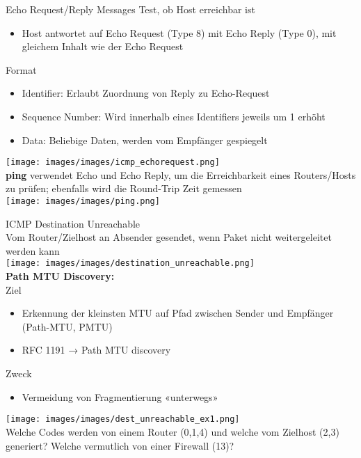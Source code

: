\begin{definition}{Echo Request/Reply Messages}
    Test, ob Host erreichbar ist
    \begin{itemize}
        \item Host antwortet auf Echo Request (Type 8) mit Echo Reply (Type 0), mit gleichem Inhalt wie der Echo Request
    \end{itemize}
    Format
    \begin{itemize}
        \item Identifier: Erlaubt Zuordnung von Reply zu Echo-Request
        \item Sequence Number: Wird innerhalb eines Identifiers jeweils um 1 erhöht
        \item Data: Beliebige Daten, werden vom Empfänger gespiegelt
    \end{itemize}
        \texttt{[image: images/images/icmp\_echorequest.png]}\\
    \textbf{ping} verwendet Echo und Echo Reply, um die Erreichbarkeit eines Routers/Hosts zu prüfen; ebenfalls wird die Round-Trip Zeit gemessen\\
        \texttt{[image: images/images/ping.png]}
\end{definition}

\begin{definition}{ICMP Destination Unreachable}\\
    Vom Router/Zielhost an Absender gesendet, wenn Paket nicht weitergeleitet werden kann\\
        \texttt{[image: images/images/destination\_unreachable.png]}\\
    \textbf{Path MTU Discovery:}\\
    Ziel
    \begin{itemize}
        \item Erkennung der kleinsten MTU auf Pfad zwischen Sender und Empfänger (Path-MTU, PMTU)
        \item RFC 1191 → Path MTU discovery
    \end{itemize}
    Zweck
    \begin{itemize}
        \item Vermeidung von Fragmentierung «unterwegs»
    \end{itemize}
\end{definition}

\begin{example}
        \texttt{[image: images/images/dest\_unreachable\_ex1.png]}\\
    Welche Codes werden von einem Router (0,1,4) und welche vom Zielhost (2,3) generiert?
    Welche vermutlich von einer Firewall (13)?
\end{example}

